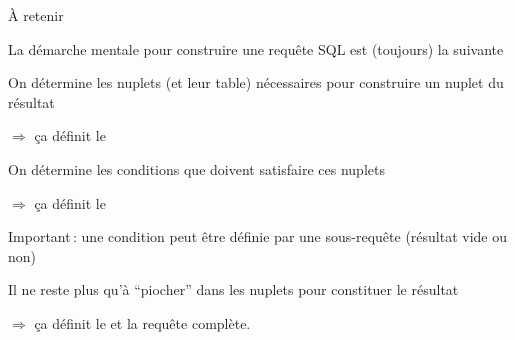 \begin{frame}{À retenir}

\vfill

La démarche mentale pour construire une requête SQL est (toujours) la suivante

\vfill

\begin{redbullet}
  \item  \alert{On détermine les nuplets (et leur table)} nécessaires pour construire
     un nuplet du résultat
     
        $\Rightarrow$ ça définit le 

  \item \alert{On détermine les conditions que doivent satisfaire ces nuplets }
  
        $\Rightarrow$ ça définit le 
    \smallskip
    
    \alert{Important}\,: une condition peut être définie par une sous-requête (résultat vide ou non)
    
   \item  \alert{Il ne reste plus qu'à ``piocher'' dans les nuplets pour constituer le résultat }
   
           $\Rightarrow$ ça définit le  et la requête complète.
   
\end{redbullet}

\vspace*{1cm}

\end{frame}



